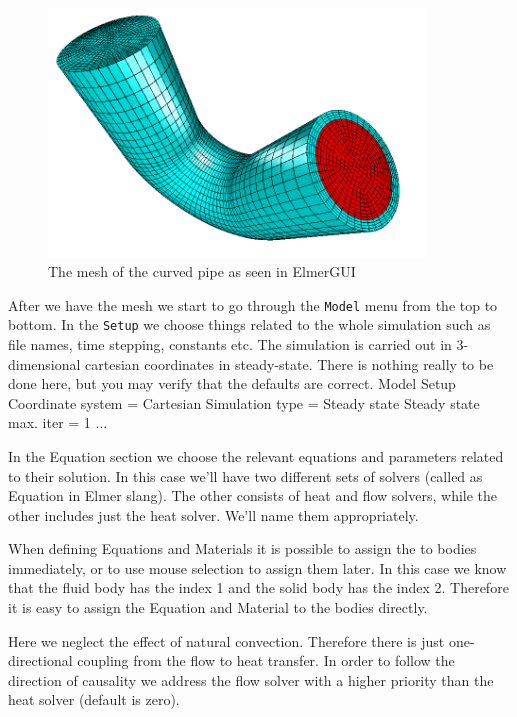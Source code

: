 \begin{figure}[h]
\centering
\includegraphics[width=10cm]{curved_pipe_gui}
\caption{The mesh of the curved pipe as seen in ElmerGUI}\label{fg:curved_pipe_mesh}
\end{figure} 


After we have the mesh we start to go through the \texttt{Model} menu from the top to bottom. 
In the \texttt{Setup} we choose things related to the whole simulation such as file names, 
time stepping, constants etc.
The simulation is carried out in 3-dimensional cartesian
coordinates in steady-state. There is nothing really to be done here, but you may verify that
the defaults are correct. 
\ttbegin
Model
  Setup 
    Coordinate system = Cartesian
    Simulation type = Steady state
    Steady state max. iter = 1
    ...
\ttend

In the Equation section we choose the relevant equations and parameters related to their solution. 
In this case we'll have two different sets of solvers (called as Equation in Elmer slang). 
The other consists of heat and flow solvers, while the 
other includes just the heat solver. We'll name them appropriately. 

When defining Equations and Materials it is possible to assign the to bodies immediately, or to use mouse
selection to assign them later. In this case we know that the fluid body has the index 1 and the 
solid body has the index 2. Therefore it is easy to assign the Equation and Material to the bodies directly. 

Here we neglect the effect of natural convection. Therefore there is just one-directional coupling from the 
flow to heat transfer. In order to follow the direction of causality we address the flow solver with a higher 
priority than the heat solver (default is zero). 	

